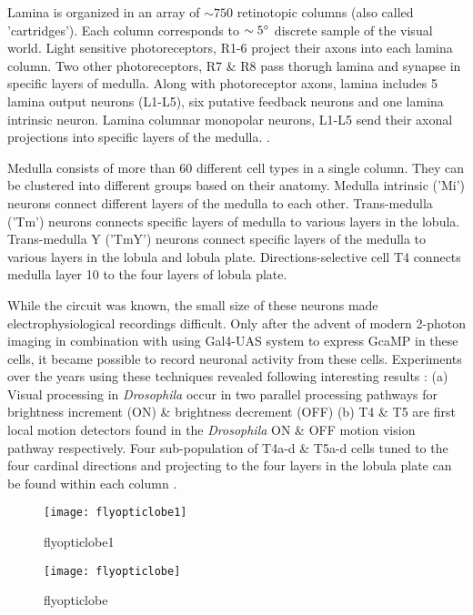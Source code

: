 Lamina is organized in an array of $\sim 750$ retinotopic columns (also called 'cartridges'). Each column corresponds to $\sim 5\degree$ discrete sample of the visual world. Light sensitive photoreceptors, R1-6 project their axons into each lamina column. Two other photoreceptors, R7 \& R8 pass thorugh lamina and synapse in specific layers of medulla. Along with photoreceptor axons, lamina includes 5 lamina output neurons (L1-L5), six putative feedback neurons and one lamina intrinsic neuron. Lamina columnar monopolar neurons, L1-L5 send their axonal projections into specific layers of the medulla. \parencite{Fischbach1989, Tuthill2013}. 

Medulla consists of more than 60 different cell types in a single column. They can be clustered into different groups based on their anatomy. Medulla intrinsic ('Mi') neurons connect different layers of the medulla to each other. Trans-medulla ('Tm') neurons connects specific layers of medulla to various layers in the lobula. Trans-medulla Y ('TmY') neurons connect specific layers of the medulla to various layers in the lobula and lobula plate. Directions-selective cell T4 connects medulla layer 10 to the four layers of lobula plate.

While the circuit was known, the small size of these neurons made electrophysiological recordings difficult. Only after the advent of modern 2-photon imaging in combination with using Gal4-UAS system to express GcaMP in these cells, it became possible to record neuronal activity from these cells. Experiments over the years using these techniques revealed following interesting results : (a) Visual processing in \textit{Drosophila} occur in two parallel processing pathways for brightness increment (ON) \& brightness decrement (OFF) \parencite{Joesch2010, Joesch2013, Strother2014, Eichner2011, Behnia2014} (b) T4 \& T5 are first local motion detectors found in the \textit{Drosophila} ON \& OFF motion vision pathway respectively. Four sub-population of T4a-d \& T5a-d cells tuned to the four cardinal directions and projecting to the four layers in the lobula plate can be found within each column \parencite{Maisak2013}. 
 
\begin{figure}[h]
\centering
\texttt{[image: flyopticlobe1]}
\caption{flyopticlobe1}
\label{fig:flyopticlobe1}
\end{figure}

\begin{figure}[h]
\centering
\texttt{[image: flyopticlobe]}
\caption{flyopticlobe}
\label{fig:flyopticlobe}
\end{figure}

